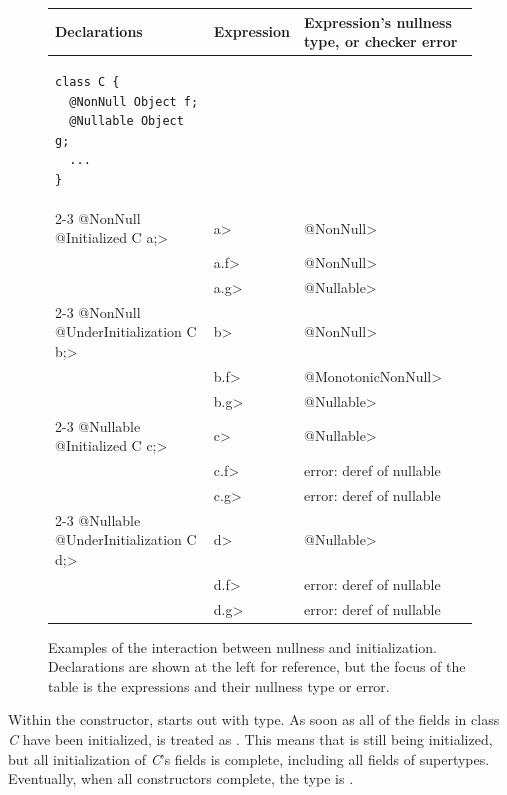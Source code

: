 \begin{figure}
\begin{tabular}{l|l|l}
Declarations & Expression & Expression's nullness type, or checker error \\ \hline
\begin{minipage}{1.5in}
\begin{Verbatim}
class C {
  @NonNull Object f;
  @Nullable Object g;
  ...
}
\end{Verbatim}
\end{minipage} & & \\ \cline{2-3}
\<@NonNull @Initialized C a;>
& \<a> & \<@NonNull> \\
& \<a.f> & \<@NonNull> \\
& \<a.g> & \<@Nullable> \\ \cline{2-3}
\<@NonNull @UnderInitialization C b;>
& \<b> & \<@NonNull> \\
& \<b.f> & \<@MonotonicNonNull> \\
& \<b.g> & \<@Nullable> \\ \cline{2-3}
\<@Nullable @Initialized C c;>
& \<c> & \<@Nullable> \\
& \<c.f> & error: deref of nullable \\
& \<c.g> & error: deref of nullable \\ \cline{2-3}
\<@Nullable @UnderInitialization C d;>
& \<d> & \<@Nullable> \\
& \<d.f> & error: deref of nullable \\
& \<d.g> & error: deref of nullable \\
\end{tabular}
\caption{Examples of the interaction between nullness and initialization.
  Declarations are shown at the left for reference, but the focus of the
  table is the expressions and their nullness type or error.}
\label{fig-initialization-examples}
\end{figure}





Within the constructor,
 starts out with  type.
As soon as all of the  fields
in class \textit{C} have been initialized,  is treated as
.
This means that  is still being initialized, but all
initialization of \textit{C}'s fields is complete, including all fields of supertypes.
Eventually, when all constructors complete, the type is
.

